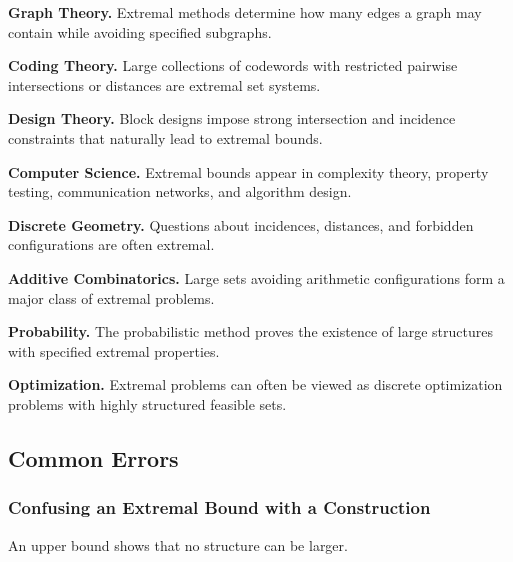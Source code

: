 \begin{applicationbox}

\textbf{Graph Theory.}
Extremal methods determine how many edges a graph may contain while
avoiding specified subgraphs.

\medskip

\textbf{Coding Theory.}
Large collections of codewords with restricted pairwise intersections
or distances are extremal set systems.

\medskip

\textbf{Design Theory.}
Block designs impose strong intersection and incidence constraints that
naturally lead to extremal bounds.

\medskip

\textbf{Computer Science.}
Extremal bounds appear in complexity theory, property testing,
communication networks, and algorithm design.

\medskip

\textbf{Discrete Geometry.}
Questions about incidences, distances, and forbidden configurations are
often extremal.

\medskip

\textbf{Additive Combinatorics.}
Large sets avoiding arithmetic configurations form a major class of
extremal problems.

\medskip

\textbf{Probability.}
The probabilistic method proves the existence of large structures with
specified extremal properties.

\medskip

\textbf{Optimization.}
Extremal problems can often be viewed as discrete optimization problems
with highly structured feasible sets.

\end{applicationbox}

\subsection{Common Errors}
\label{subsec:extremal-combinatorics-common-errors}

\subsubsection{Confusing an Extremal Bound with a Construction}

An upper bound shows that no structure can be larger.

